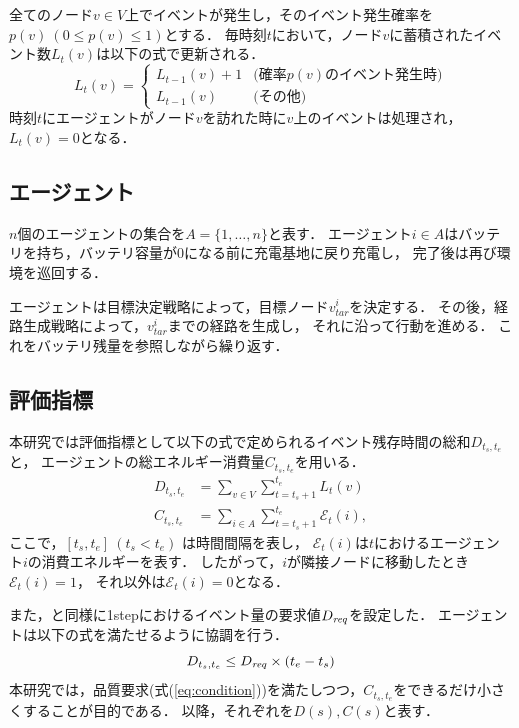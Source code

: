 \documentclass[11pt,a4j,twocolumn]{jarticle}
\def\AgentSet{A}
\def\Dreq{{D_{\it req}}}
\def\En{\mathcal{E}}
\begin{document}
全てのノード$v\in V$上でイベントが発生し，そのイベント発生確率を$p(v)~(0\leq p(v)\leq 1)$とする．
毎時刻$t$において，ノード$v$に蓄積されたイベント数$L_t(v)$は以下の式で更新される．
%
\begin{equation}
  L_t(v) = \left\{
\begin{array}{ll}
  L_{t-1}(v) + 1 & \textrm{(確率$p(v)$のイベント発生時)} \\
  L_{t-1}(v) & \textrm{(その他)}
\end{array}
\right.  
\end{equation}
%
時刻$t$にエージェントがノード$v$を訪れた時に$v$上のイベントは処理され，$L_t(v) = 0$となる．

\subsection{エージェント}
$n$個のエージェントの集合を$\AgentSet=\{1,\dots ,n\}$と表す．
エージェント$i\in\AgentSet$はバッテリを持ち，バッテリ容量が0になる前に充電基地に戻り充電し，
完了後は再び環境を巡回する．
\par

エージェントは目標決定戦略によって，目標ノード$v^i_{tar}$を決定する．
その後，経路生成戦略によって，$v^i_{tar}$までの経路を生成し，
それに沿って行動を進める．
これをバッテリ残量を参照しながら繰り返す．

\subsection{評価指標}
本研究では評価指標として以下の式で定められるイベント残存時間の総和$D_{t_s,t_e}$と，
エージェントの総エネルギー消費量$C_{t_s,t_e}$を用いる．
%
\begin{align}
  D_{t_s,t_e} &= \sum_{v \in V} \sum^{t_e}_{t=t_s+1} L_t(v)\\
  C_{t_s,t_e} &= \sum_{i \in \AgentSet} \sum^{t_e}_{t=t_s+1} \En_t(i),
\end{align}
%
ここで，$[t_s,t_e]~(t_s < t_e)$ は時間間隔を表し，
$\En_t(i)$は$t$におけるエージェント$i$の消費エネルギーを表す．
したがって，$i$が隣接ノードに移動したとき$\En_t(i)=1$，
それ以外は$\En_t(i)=0$となる．
\par
また，\cite{Wu2019}と同様に1stepにおけるイベント量の要求値$\Dreq$を設定した．
エージェントは以下の式を満たせるように協調を行う．
%
\begin{equation}\label{eq:condition}
  D_{t_s,t_e}\leq \Dreq \times (t_e - t_s)
\end{equation}
%
本研究では，品質要求(式(\ref{eq:condition}))を満たしつつ，$C_{t_s, t_e}$をできるだけ小さくすることが目的である．
以降，それぞれを$D(s), C(s)$と表す．
\end{document}
